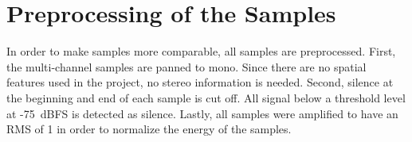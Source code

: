 \section{Preprocessing of the Samples}
\label{sec:Preprocessing}
In order to make samples more comparable, all samples are preprocessed. First, the multi-channel samples are panned to mono. Since there are no spatial features used in the project, no stereo information is needed. Second, silence at the beginning and end of each sample is cut off. All signal below a threshold level at -75~dBFS is detected as silence. Lastly, all samples were amplified to have an RMS of 1 in order to normalize the energy of the samples.